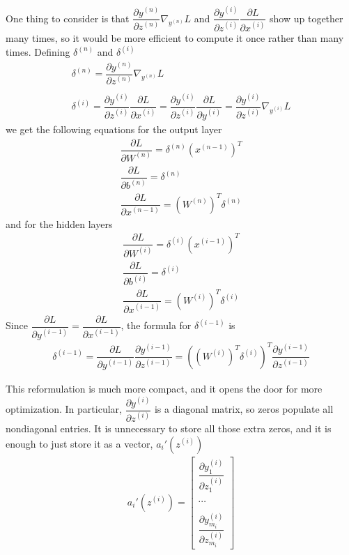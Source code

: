 \documentclass{article}
\begin{document}
	One thing to consider is that \( \dfrac{\partial y^{(n)}}{\partial z^{(n)}} \nabla_{y^{(n)}}L \) and \( \dfrac{\partial y^{(i)}}{\partial z^{(i)}} \dfrac{\partial L}{\partial x^{(i)}} \) show up together many times, so it would be more efficient to compute it once rather than many times. Defining \( \delta^{(n)} \) and \(\delta^{(i)} \)
	\begin{gather*}
		\delta^{(n)} = \dfrac{\partial y^{(n)}}{\partial z^{(n)}} \nabla_{y^{(n)}}L \\ \\
		\delta^{(i)} = \dfrac{\partial y^{(i)}}{\partial z^{(i)}} \dfrac{\partial L}{\partial x^{(i)}} = \dfrac{\partial y^{(i)}}{\partial z^{(i)}} \dfrac{\partial L}{\partial y^{(i)}} = \dfrac{\partial y^{(i)}}{\partial z^{(i)}} \nabla_{y^{(i)}}L
	\end{gather*}
	we get the following equations for the output layer
	\begin{gather*}
		\dfrac{\partial L}{\partial W^{(n)}} = \delta^{(n)}  \left( x^{(n - 1)} \right)^T \\
		\dfrac{\partial L}{\partial b^{(n)}} = \delta^{(n)} \\
		\dfrac{\partial L}{\partial x^{(n - 1)}} = \left(  W^{(n)} \right)^T \delta^{(n)}
	\end{gather*}
	and for the hidden layers
	\begin{gather*}
		\dfrac{\partial L}{\partial W^{(i)}} = \delta^{(i)} \left( x^{(i - 1)} \right)^T \\
		\dfrac{\partial L}{\partial b^{(i)}} = \delta^{(i)} \\
		\dfrac{\partial L}{\partial x^{(i - 1)}} = \left( W^{(i)} \right)^T \delta^{(i)}
	\end{gather*}
	Since \( \dfrac{\partial L}{\partial y^{(i - 1)}} = \dfrac{\partial L}{\partial x^{(i - 1)}} \), the formula for \( \delta^{(i - 1)} \) is
	\begin{gather*}
		\delta^{(i - 1)} = \dfrac{\partial L}{\partial y^{(i - 1)}} \dfrac{\partial y^{(i - 1)}}{\partial z^{(i - 1)}} = \left( \left( W^{(i)} \right)^T \delta^{(i)} \right)^T \dfrac{\partial y^{(i - 1)}}{\partial z^{(i - 1)}}
	\end{gather*}
	
	This reformulation is much more compact, and it opens the door for more optimization. In particular, \( \dfrac{\partial y^{(i)}}{\partial z^{(i)}} \) is a diagonal matrix, so zeros populate all nondiagonal entries. It is unnecessary to store all those extra zeros, and it is enough to just store it as a vector, \( a_{i}'(z^{(i)}) \)
	\begin{gather*}
		a_{i}'(z^{(i)}) = \begin{bmatrix}
			\dfrac{\partial y^{(i)}_1}{\partial z^{(i)}_1} \\ \\
			\cdots \\ \\
			\dfrac{\partial y^{(i)}_{m_i}}{\partial z^{(i)}_{m_i}}
		\end{bmatrix}
	\end{gather*}
	
\end{document}
